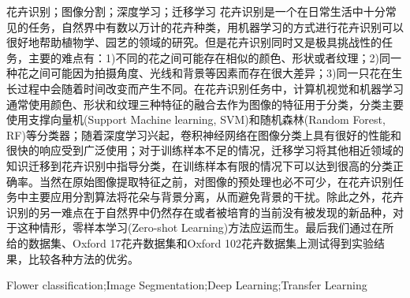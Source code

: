 \documentclass[supercite]{HustGraduPaper}
\begin{document}
\begin{sloppypar}
	\begin{cnabstract}{花卉识别；图像分割；深度学习；迁移学习}
		花卉识别是一个在日常生活中十分常见的任务，自然界中有数以万计的花卉种类，用机器学习的方式进行花卉识别可以很好地帮助植物学、园艺的领域的研究。但是花卉识别同时又是极具挑战性的任务，主要的难点有：1)不同的花之间可能存在相似的颜色、形状或者纹理；2)同一种花之间可能因为拍摄角度、光线和背景等因素而存在很大差异；3)同一只花在生长过程中会随着时间改变而产生不同。在花卉识别任务中，计算机视觉和机器学习通常使用颜色、形状和纹理三种特征的融合去作为图像的特征用于分类，分类主要使用支撑向量机(Support Machine learning, SVM)和随机森林(Random Forest, RF)等分类器；随着深度学习兴起，卷积神经网络在图像分类上具有很好的性能和很快的响应受到广泛使用；对于训练样本不足的情况，迁移学习将其他相近领域的知识迁移到花卉识别中指导分类，在训练样本有限的情况下可以达到很高的分类正确率。当然在原始图像提取特征之前，对图像的预处理也必不可少，在花卉识别任务中主要应用分割算法将花朵与背景分离，从而避免背景的干扰。除此之外，花卉识别的另一难点在于自然界中仍然存在或者被培育的当前没有被发现的新品种，对于这种情形，零样本学习(Zero-shot Learning)方法应运而生。最后我们通过在所给的数据集、Oxford 17花卉数据集和Oxford 102花卉数据集上测试得到实验结果，比较各种方法的优劣。
	\end{cnabstract}
	\clearpage
	\phantom{s}
    \thispagestyle{empty}
	\begin{enabstract}{Flower classification;Image Segmentation;Deep Learning;Transfer Learning}

\end{enabstract}
\end{sloppypar}
\end{document}
